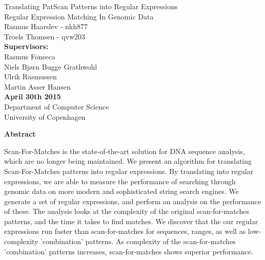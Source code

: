 \documentclass[12pt]{article}
\theoremstyle{definition}
\begin{document}
\begin{titlepage}
    \vspace*{\fill}
    \begin{center}
      {\Huge Translating PatScan Patterns into Regular Expressions}\\[0.7cm]
      {\Large Regular Expression Matching In Genomic Data}\\[0.4cm]
      {\large Rasmus Haarslev - nkh877}\\
      {\large Troels Thomsen - qvw203}\\[0.4cm]
      {\textbf{Supervisors:}\\
      Rasmus Fonseca\\
      Niels Bjørn Bugge Grathwohl\\
      Ulrik Rasmussen\\
      Martin Asser Hansen}\\
      {\small \textbf{April 30th 2015}}\\[0.3cm] 
      {\small Department of Computer Science}\\
      {\small University of Copenhagen}
    \end{center}
    \vspace*{\fill}
\end{titlepage}	

\clearpage
{}
\thispagestyle{empty}

\newpage

\begin{center}
\textbf{Abstract}
\end{center}

Scan-For-Matches is the state-of-the-art solution for DNA sequence analysis, which are no longer being maintained. We present an algorithm for translating Scan-For-Matches patterns into regular expressions. By translating into regular expressions, we are able to measure the performance of searching through genomic data on more modern and sophisticated string search engines. We generate a set of regular expressions, and perform an analysis on the performance of these. The analysis looks at the complexity of the original scan-for-matches patterns, and the time it takes to find matches. We discover that the our regular expressions run faster than scan-for-matches for sequences, ranges, as well as low-complexity 'combination' patterns. As complexity of the scan-for-matches 'combination' patterns increases, scan-for-matches shows superior performance. 

\newpage
\end{document}
